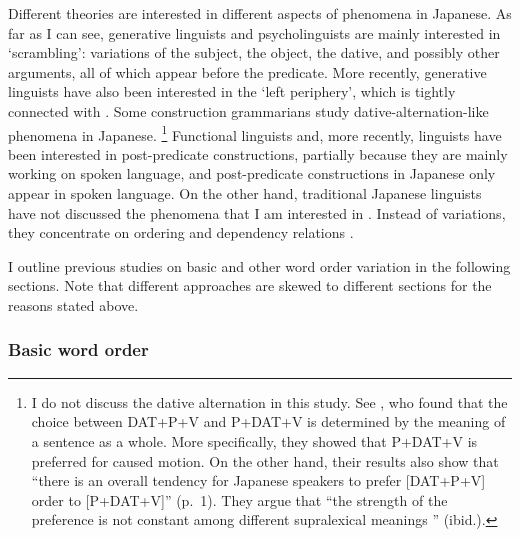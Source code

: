 Different theories are interested in different aspects of  phenomena in Japanese.
As far as I can see, generative linguists and psycholinguists are mainly interested in `scrambling':
 variations of the subject, the object, the dative, and possibly other arguments,
all of which appear before the predicate.
More recently, generative linguists have also been interested in the `left periphery',
which is tightly connected with .
Some construction grammarians study dative-alternation-like phenomena in Japanese.%
 \footnote{
 I do not discuss the dative alternation in this study.
 See ,
 who found that the choice between DAT+P+V and P+DAT+V is determined
 by the meaning of a sentence as a whole.
 More specifically, they showed that P+DAT+V is preferred for caused motion.
 On the other hand, their results also show that
 ``there is an overall tendency for Japanese speakers to prefer [DAT+P+V] order to [P+DAT+V]'' (p.~1).
 They argue that ``the strength of the preference is not constant among different supralexical meanings '' (ibid.).
 }
Functional linguists and, more recently,  linguists have been interested in post-predicate constructions,
partially because they are mainly working on spoken language,
and post-predicate constructions in Japanese only appear in spoken language.
On the other hand,
traditional Japanese linguists have not discussed the  phenomena
that I am interested in \cite[except for][]{noda83}.
Instead of  variations, they concentrate on  ordering and dependency relations \cite[see e.g.,][]{saeki98}.

I outline previous studies on basic  and other word order variation in the following sections.
Note that different approaches are skewed to different sections for the reasons stated above.



\subsubsection{Basic word order}

